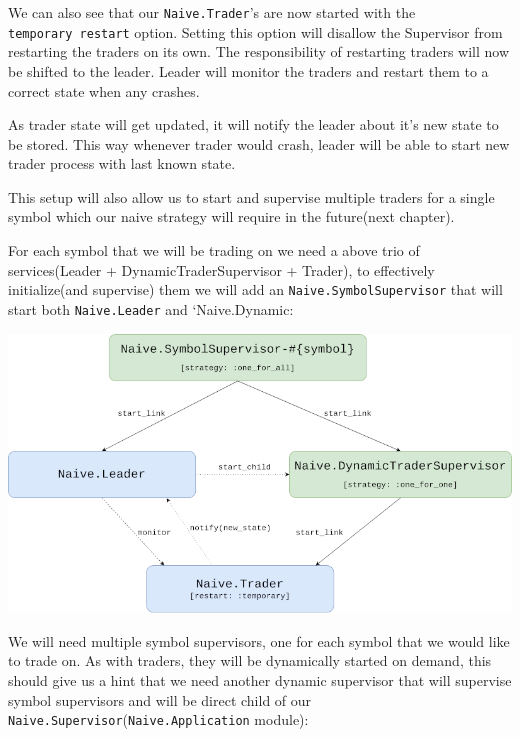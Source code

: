 \documentclass[
  oneside]{book}
\begin{document}
We can also see that our \texttt{Naive.Trader}'s are now started with the \texttt{temporary\ restart} option. Setting this option will disallow the Supervisor from restarting the traders on its own. The responsibility of restarting traders will now be shifted to the leader. Leader will monitor the traders and restart them to a correct state when any crashes.

As trader state will get updated, it will notify the leader about it's new state to be stored. This way whenever trader would crash, leader will be able to start new trader process with last known state.

This setup will also allow us to start and supervise multiple traders for a single symbol which our naive strategy will require in the future(next chapter).

For each symbol that we will be trading on we need a above trio of services(Leader + DynamicTraderSupervisor + Trader), to effectively initialize(and supervise) them we will add an \texttt{Naive.SymbolSupervisor} that will start both \texttt{Naive.Leader} and `Naive.Dynamic:

\includegraphics{images/chapter_05_04_symbol_sup.png}

We will need multiple symbol supervisors, one for each symbol that we would like to trade on. As with traders, they will be dynamically started on demand, this should give us a hint that we need another dynamic supervisor that will supervise symbol supervisors and will be direct child of our \texttt{Naive.Supervisor}(\texttt{Naive.Application} module):
\end{document}
